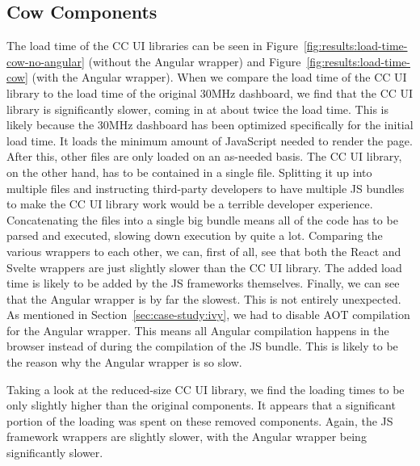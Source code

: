 \subsection{Cow Components}
The load time of the CC UI libraries can be seen in Figure~\ref{fig:results:load-time-cow-no-angular} (without the Angular wrapper) and Figure~\ref{fig:results:load-time-cow} (with the Angular wrapper). When we compare the load time of the CC UI library to the load time of the original 30MHz dashboard, we find that the CC UI library is significantly slower, coming in at about twice the load time. This is likely because the 30MHz dashboard has been optimized specifically for the initial load time. It loads the minimum amount of JavaScript needed to render the page. After this, other files are only loaded on an as-needed basis. The CC UI library, on the other hand, has to be contained in a single file. Splitting it up into multiple files and instructing third-party developers to have multiple JS bundles to make the CC UI library work would be a terrible developer experience. Concatenating the files into a single big bundle means all of the code has to be parsed and executed, slowing down execution by quite a lot.
Comparing the various wrappers to each other, we can, first of all, see that both the React and Svelte wrappers are just slightly slower than the CC UI library. The added load time is likely to be added by the JS frameworks themselves. Finally, we can see that the Angular wrapper is by far the slowest. This is not entirely unexpected. As mentioned in Section~\ref{sec:case-study:ivy}, we had to disable AOT compilation for the Angular wrapper. This means all Angular compilation happens in the browser instead of during the compilation of the JS bundle. This is likely to be the reason why the Angular wrapper is so slow.

Taking a look at the reduced-size CC UI library, we find the loading times to be only slightly higher than the original components. It appears that a significant portion of the loading was spent on these removed components. Again, the JS framework wrappers are slightly slower, with the Angular wrapper being significantly slower.

